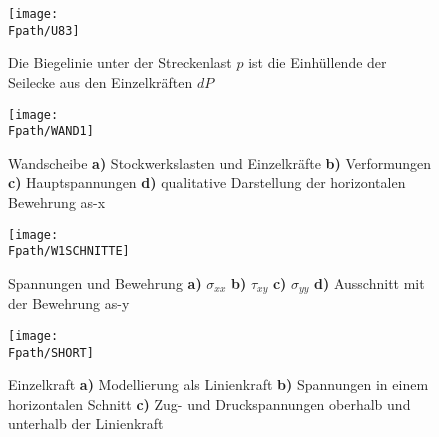 {%
\begin{figure}
\centering
{\texttt{[image: \\Fpath/U83]}}
  \caption{Die Biegelinie unter der Streckenlast $p$ ist die Einh\"{u}llende der Seilecke aus den Einzelkr\"{a}ften $dP$}
  \label{U83}
\end{figure}%



\begin{figure}[tbp] \centering
\if {} \sidecaption \fi
\texttt{[image: \\Fpath/WAND1]}
\caption{Wandscheibe {\bf a)} Stockwerkslasten und Einzelkr\"{a}fte {\bf b)} Verformungen
{\bf c)} Hauptspannungen {\bf d)} qualitative Darstellung der horizontalen Bewehrung
as-x } \label{Wand1}
\end{figure}%
\begin{figure}[tbp] \centering
\if {} \sidecaption \fi
\texttt{[image: \\Fpath/W1SCHNITTE]}
\caption{Spannungen und Bewehrung {\bf a)} $\sigma_{xx}$ {\bf b)} $\tau_{xy}$ {\bf c)}
$\sigma_{yy}$ {\bf d)} Ausschnitt mit der Bewehrung as-y} \label{W1Schnitte}
\end{figure}%


\begin{figure}[tbp] \centering
\if {} \sidecaption \fi
\texttt{[image: \\Fpath/SHORT]}
\caption{Einzelkraft {\bf a)} Modellierung als Linienkraft {\bf b)} Spannungen in einem
horizontalen Schnitt {\bf c)} Zug- und Druckspannungen oberhalb und unterhalb der
Linienkraft} \label{Short}
\end{figure}%

}
